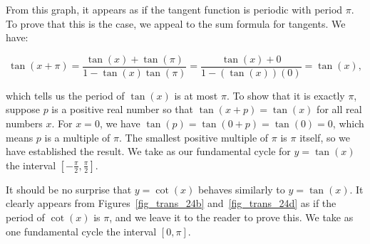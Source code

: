 From this graph, it appears as if the tangent function is periodic with period $\pi$.  To prove that this is the case, we appeal to the sum formula for tangents.  We have: 

\[ \tan(x+\pi) = \dfrac{\tan(x) + \tan(\pi)}{1 - \tan(x) \tan(\pi)} = \dfrac{\tan(x) + 0}{1 - (\tan(x) )(0)} = \tan(x),\]

which tells us the period of $\tan(x)$ is at most $\pi$.  To show that it is exactly $\pi$, suppose $p$ is a positive real number so that $\tan(x+p) = \tan(x)$ for all real numbers $x$.  For $x=0$, we have $\tan(p) = \tan(0+p) = \tan(0) = 0$, which means $p$ is a multiple of $\pi$.  The smallest positive multiple of $\pi$ is $\pi$ itself, so we have established the result. We take as our fundamental cycle for $y=\tan(x)$ the interval $\left[-\frac{\pi}{2}, \frac{\pi}{2}\right]$.

It should be no surprise that $y = \cot(x)$ behaves similarly to $y = \tan(x)$.   It clearly appears from Figures~\ref{fig_trans_24b} and~\ref{fig_trans_24d} as if the period of $\cot(x)$ is $\pi$, and we leave it to the reader to prove this.  We take as one fundamental cycle the interval $[0,\pi]$.





